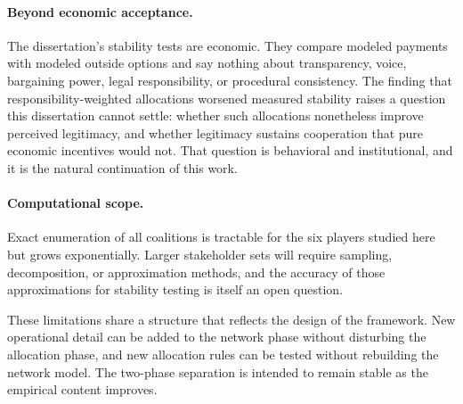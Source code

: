 \paragraph{Beyond economic acceptance.} The dissertation's stability tests are economic. They compare modeled payments with modeled outside options and say nothing about transparency, voice, bargaining power, legal responsibility, or procedural consistency. The finding that responsibility-weighted allocations worsened measured stability raises a question this dissertation cannot settle: whether such allocations nonetheless improve perceived legitimacy, and whether legitimacy sustains cooperation that pure economic incentives would not. That question is behavioral and institutional, and it is the natural continuation of this work.

\paragraph{Computational scope.} Exact enumeration of all coalitions is tractable for the six players studied here but grows exponentially. Larger stakeholder sets will require sampling, decomposition, or approximation methods, and the accuracy of those approximations for stability testing is itself an open question.

These limitations share a structure that reflects the design of the framework. New operational detail can be added to the network phase without disturbing the allocation phase, and new allocation rules can be tested without rebuilding the network model. The two-phase separation is intended to remain stable as the empirical content improves.
